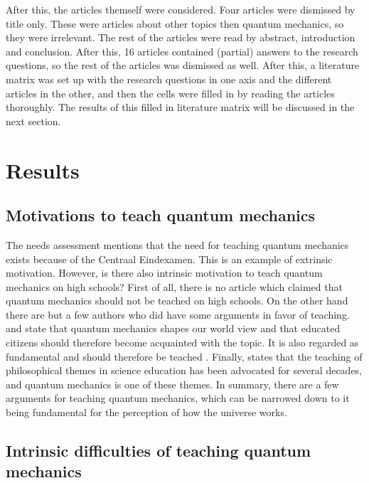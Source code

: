 \documentclass[11pt,twoside]{report} %
\begin{document}
After this, the articles themself were considered. Four articles were dismissed by title only. These were articles about other topics then quantum mechanics, so they were irrelevant. The rest of the articles were read by abstract, introduction and conclusion. After this, 16 articles contained (partial) answers to the research questions, so the rest of the articles was dismissed as well. After this, a literature matrix was set up with the research questions in one axis and the different articles in the other, and then the cells were filled in by reading the articles thoroughly. The results of this filled in literature matrix will be discussed in the next section.

\section{Results}

\subsection{Motivations to teach quantum mechanics}

The needs assessment mentions that the need for teaching quantum mechanics exists because of the Centraal Eindexamen. This is an example of extrinsic motivation. However, is there also intrinsic motivation to teach quantum mechanics on high schools? First of all, there is no article which claimed that quantum mechanics should not be teached on high schools. On the other hand there are but a few authors who did have some arguments in favor of teaching.  and  state that quantum mechanics shapes our world view and that educated citizens should therefore become acquainted with the topic. It is also regarded as fundamental and should therefore be teached \cite{henriksen,hobson}. Finally,  states that the teaching of philosophical themes in science education has been advocated for several decades, and quantum mechanics is one of these themes. In summary, there are a few arguments for teaching quantum mechanics, which can be narrowed down to it being fundamental for the perception of how the universe works.

\subsection{Intrinsic difficulties of teaching quantum mechanics}
\end{document}
